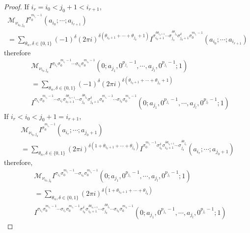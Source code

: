 \begin{proof}
If $i_r=i_0<j_0+1<i_{r+1}$,
\begin{multline}
\mathcal M_{\nu_{i_0,j_0}}I^{\sigma_0^{m_{i_r}-1}}(a_{i_0};\cdots;a_{i_{r+1}})\\
=\sum_{\theta_\alpha,\delta\in\{0,1\}}(-1)^\delta(2\pi i)^{\delta(\theta_{i_0+1}+\cdots+\theta_{j_0}+1)}I^{\sigma_{i_0+1}^{\delta\theta_{i_0+1}}\cdots\sigma_{j_0}^{\delta\theta_{j_0}}\sigma_{j_0+1}^\delta\sigma_0^{m_{i_r}-1}}(a_{i_0};\cdots;a_{i_{r+1}})
\end{multline}
therefore
\begin{equation}
\begin{aligned}
&\mathcal M_{\nu_{i_0,j_0}}I^{\sigma_{i_1}\sigma_0^{m_{i_1}-1}\cdots\sigma_{i_k}\sigma_0^{m_{i_k}-1}}(0;a_{j_1},0^{p_{j_1}-1},\cdots,a_{j_l},0^{p_{j_l}-1};1)\\
&=\sum_{\theta_\alpha,\delta\in\{0,1\}}(-1)^\delta(2\pi i)^{\delta(\theta_{i_0+1}+\cdots+\theta_{j_0}+1)}\\
&I^{\sigma_{i_1}\sigma_0^{m_{i_1}-1}\cdots\sigma_{i_r}\sigma_{i_0+1}^{\delta\theta_{i_0+1}}\cdots\sigma_{j_0}^{\delta\theta_{j_0}}\sigma_{j_0+1}^\delta\sigma_0^{m_{i_r}-1}\cdots\sigma_{i_k}\sigma_0^{m_{i_k}-1}}(0;a_{j_1},0^{p_{j_1}-1},\cdots,a_{j_l},0^{p_{j_l}-1};1)
\end{aligned}
\end{equation}
If $i_r<i_0<j_0+1=i_{r+1}$,
\begin{multline}
\mathcal M_{\nu_{i_0,j_0}}I^{\sigma_0^{m_{i_r}-1}}(a_{i_r};\cdots;a_{j_0+1})\\
=\sum_{\theta_\alpha,\delta\in\{0,1\}}(2\pi i)^{\delta(1+\theta_{i_0+1}+\cdots+\theta_{j_0})}I^{\sigma_0^{m_{i_r}-1}\sigma_{i_0}^\delta\sigma_{i_0+1}^{\delta\theta_{i_0+1}}\cdots\sigma_{j_0}^{\delta\theta_{j_0}}}(a_{i_r};\cdots;a_{j_0+1})
\end{multline}
therefore,
\begin{equation}
\begin{aligned}
&\mathcal M_{\nu_{i_0,j_0}}I^{\sigma_{i_1}\sigma_0^{m_{i_1}-1}\cdots\sigma_{i_k}\sigma_0^{m_{i_k}-1}}(0;a_{j_1},0^{p_{j_1}-1},\cdots,a_{j_l},0^{p_{j_l}-1};1)\\
&=\sum_{\theta_\alpha,\delta\in\{0,1\}}(2\pi i)^{\delta(1+\theta_{i_0+1}+\cdots+\theta_{j_0})}\\
&I^{\sigma_{i_1}\sigma_0^{m_{i_1}-1}\cdots\sigma_{i_r}\sigma_0^{m_{i_r}-1}\sigma_{i_0}^\delta\sigma_{i_0+1}^{\delta\theta_{i_0+1}}\cdots\sigma_{j_0}^{\delta\theta_{j_0}}\cdots\sigma_{i_k}\sigma_0^{m_{i_k}-1}}(0;a_{j_1},0^{p_{j_1}-1},\cdots,a_{j_l},0^{p_{j_l}-1};1)
\end{aligned}
\end{equation}
\end{proof}

